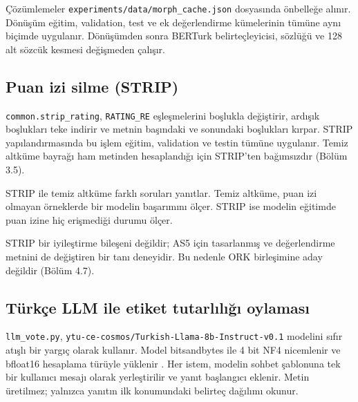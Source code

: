 \documentclass[11pt]{article}
\begin{document}
Çözümlemeler \texttt{experiments/\allowbreak{}\allowbreak{}data/\allowbreak{}\allowbreak{}morph\_\allowbreak{}\allowbreak{}cache.\allowbreak{}\allowbreak{}json} dosyasında önbelleğe alınır. Dönüşüm eğitim, validation, test ve ek değerlendirme kümelerinin tümüne aynı biçimde uygulanır. Dönüşümden sonra BERTurk belirteçleyicisi, sözlüğü ve 128 alt sözcük kesmesi değişmeden çalışır.

\subsection{Puan izi silme (STRIP)}

\texttt{common.\allowbreak{}\allowbreak{}strip\_\allowbreak{}\allowbreak{}rating}, \texttt{RATING\_\allowbreak{}\allowbreak{}RE} eşleşmelerini boşlukla değiştirir, ardışık boşlukları teke indirir ve metnin başındaki ve sonundaki boşlukları kırpar. STRIP yapılandırmasında bu işlem eğitim, validation ve testin tümüne uygulanır. Temiz altküme bayrağı ham metinden hesaplandığı için STRIP'ten bağımsızdır (Bölüm 3.5).

STRIP ile temiz altküme farklı soruları yanıtlar. Temiz altküme, puan izi olmayan örneklerde bir modelin başarımını ölçer. STRIP ise modelin eğitimde puan izine hiç erişmediği durumu ölçer.

STRIP bir iyileştirme bileşeni değildir; AS5 için tasarlanmış ve değerlendirme metnini de değiştiren bir tanı deneyidir. Bu nedenle ORK birleşimine aday değildir (Bölüm 4.7).

\subsection{Türkçe LLM ile etiket tutarlılığı oylaması}

\texttt{llm\_\allowbreak{}\allowbreak{}vote.\allowbreak{}\allowbreak{}py}, \texttt{ytu-{}\allowbreak{}ce-{}\allowbreak{}cosmos/\allowbreak{}\allowbreak{}Turkish-{}\allowbreak{}Llama-{}\allowbreak{}8b-{}\allowbreak{}Instruct-{}\allowbreak{}v0.\allowbreak{}\allowbreak{}1} modelini \citep{kesgin2024} sıfır atışlı bir yargıç olarak kullanır. Model bitsandbytes ile 4 bit NF4 nicemlenir ve bfloat16 hesaplama türüyle yüklenir \citep{dettmers2023}. Her istem, modelin sohbet şablonuna tek bir kullanıcı mesajı olarak yerleştirilir ve yanıt başlangıcı eklenir. Metin üretilmez; yalnızca yanıtın ilk konumundaki belirteç dağılımı okunur.
\end{document}
